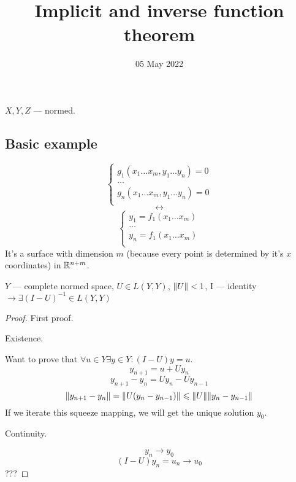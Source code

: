 
\title{Implicit and inverse function theorem}
\author{}
\date{05 May 2022}

\maketitle

\begin{thr}
$X, Y, Z$ --- normed.
\end{thr}

\subsection*{Basic example}
\[ \begin{cases}
    g_1(x_1 \dots x_m, y_1 \dots y_n) = 0\\
    \dots \\
    g_n(x_1 \dots x_m, y_1 \dots y_n) = 0\\
\end{cases} \]
\[ \leftrightarrow \] 
\[ \begin{cases}
    y_1 = f_1(x_1 \dots x_m)\\
    \dots \\
    y_n = f_1(x_1 \dots x_m)\\
\end{cases} \]
It's a surface with dimension $m$ (because every point is determined by it's $x$ coordinates) in $\mathbb R^{n+m}$.

\begin{thr}
$Y$ --- complete normed space, $U \in L(Y, Y)$, $\norm{U} < 1$, I --- identity\\
$ \to \exists (I - U)^{-1} \in L(Y, Y) $
\end{thr}
\begin{proof} First proof.

\par Existence.

Want to prove that $\forall u \in Y \exists y \in Y: (I - U)y =  u$.
\[ y_{n+1} = u + Uy_n \] 
\[ y_{n+1} - y_n = Uy_n - Uy_{n-1} \] 
\[ \norm{ y_{n+1} - y_n } = \norm{U(y_n - y_{n-1})} \leqslant \norm{U}\norm{y_n - y_{n-1}} \] 
If we iterate this squeeze mapping, we will get the unique solution $y_0$.

\par Continuity.

\[ y_n \to y_0 \] 
\[ (I - U)y_n = u_n \to u_0 \] 
???

\end{proof}

